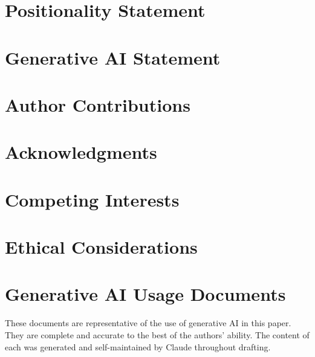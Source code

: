 \documentclass[manuscript,screen,review,anonymous]{acmart}
\newif\ifanon
\begin{document}
\section*{Positionality Statement}



\section*{Generative AI Statement}



\ifanon\else

\section*{Author Contributions}



\section*{Acknowledgments}



\section*{Competing Interests}



\fi

\section*{Ethical Considerations}






\ifanon\def\genaidir{sections/appendix/anon}\else\def\genaidir{sections/appendix/named}\fi
\appendix
\section{Generative AI Usage Documents}\label{app:genai}
These documents are representative of the use of generative AI in this paper. They are complete and accurate to the best of the authors' ability. The content of each was generated and self-maintained by Claude throughout drafting.


\end{document}

